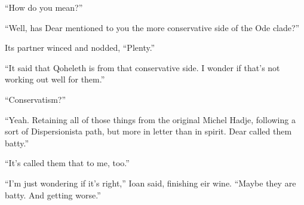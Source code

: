 ``How do you mean?''

``Well, has Dear mentioned to you the more conservative side of the Ode clade?''

Its partner winced and nodded, ``Plenty.''

``It said that Qoheleth is from that conservative side. I wonder if that's not working out well for them.''

``Conservatism?''

``Yeah. Retaining all of those things from the original Michel Hadje, following a sort of Dispersionista path, but more in letter than in spirit. Dear called them batty.''

``It's called them that to me, too.''

``I'm just wondering if it's right,'' Ioan said, finishing eir wine. ``Maybe they are batty. And getting worse.''
